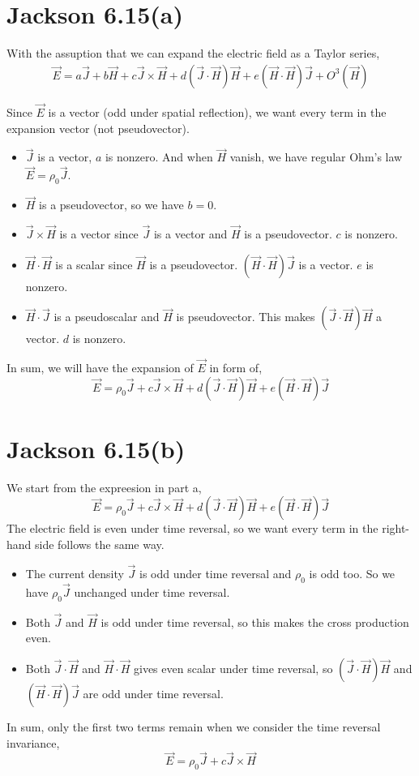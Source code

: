 \documentclass{article}
\begin{document}
\section*{Jackson 6.15(a)}

With the assuption that we can expand the electric field as a Taylor series,
\begin{align*}
  \vec E=a\vec J+b\vec H+c\vec J\times\vec H+d(\vec J\cdot\vec H)\vec H+e(\vec H\cdot\vec H)\vec J+O^3(\vec H)
\end{align*}

Since $\vec E$ is a vector (odd under spatial reflection), we want every term in the expansion vector (not pseudovector).

\begin{itemize}
\item $\vec J$ is a vector, $a$ is nonzero. And when $\vec H$ vanish, we have regular Ohm's law $\vec E=\rho_0 \vec J$.
\item $\vec H$ is a pseudovector, so we have $b=0$.
\item $\vec J\times\vec H$ is a vector since $\vec J$ is a vector and $\vec H$ is a pseudovector. $c$ is nonzero.
\item $\vec H\cdot\vec H$ is a scalar since $\vec H$ is a pseudovector. $(\vec H\cdot\vec H)\vec J$ is a vector. $e$ is nonzero.
\item $\vec H\cdot\vec J$ is a pseudoscalar and $\vec H$ is pseudovector. This makes $(\vec J\cdot\vec H)\vec H$ a vector. $d$ is nonzero.
\end{itemize}
In sum, we will have the expansion of $\vec E$ in form of,
\[\boxed{\vec E=\rho_0\vec J+c\vec J\times\vec H+d(\vec J\cdot\vec H)\vec H+e(\vec H\cdot\vec H)\vec J}\]

\section*{Jackson 6.15(b)}

We start from the expreesion in part a,
\[{\vec E=\rho_0\vec J+c\vec J\times\vec H+d(\vec J\cdot\vec H)\vec H+e(\vec H\cdot\vec H)\vec J}\]
The electric field is even under time reversal, so we want every term in the right-hand side follows the same way.
\begin{itemize}
\item The current density $\vec J$ is odd under time reversal and $\rho_0$ is odd too. So we have $\rho_0\vec J$ unchanged under time reversal.
\item Both $\vec J$ and $\vec H$ is odd under time reversal, so this makes the cross production even.
\item Both $\vec J\cdot\vec H$ and $\vec H\cdot\vec H$ gives even scalar under time reversal, so $(\vec J\cdot\vec H)\vec H$ and $(\vec H\cdot\vec H)\vec J$ are odd under time reversal.
\end{itemize}
In sum, only the first two terms remain when we consider the time reversal invariance,
\[ \boxed{\vec E=\rho_0\vec J+c\vec J\times\vec H} \]
\pagebreak
\end{document}
